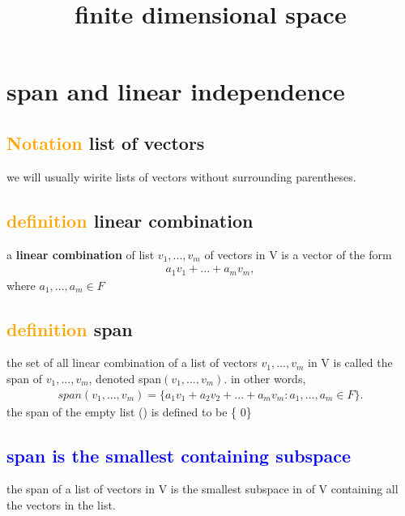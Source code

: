 \documentclass[a4paper,12pt]{article}
\begin{document}
\title {finite dimensional space}
\maketitle

\tableofcontents
\newpage

\section{\textbf{span and linear independence}}
    \subsection{\textcolor{orange}{Notation} \textbf{list of vectors}}
    we will usually wirite lists of vectors without surrounding parentheses.

    \subsection{\textcolor{orange}{definition} \textbf{linear combination}}
    a \textbf{linear combination} of list $v_1,...,v_m$ of vectors in V is a vector of the form
    \begin{align*}
        a_1v_1 + ... + a_mv_m,
    \end{align*}
    where $a_1,...,a_m \in F$

    \subsection{\textcolor{orange}{definition} \textbf{span}}
    the set of all linear combination of a list of vectors $v_1,...,v_m$ in V is  called the span of 
    $v_1,...,v_m$, denoted span$(v_1,...,v_m)$. in other words,
    \begin{align*}
        span(v_1,...,v_m) = \{a_1v_1 + a_2v_2 + ... + a_mv_m : a_1,...,a_m \in F\}.
    \end{align*}
    the span of the empty list () is defined to be \{ 0\}

    \subsection{\textcolor{blue}{span is the smallest containing subspace}}
    the span of a list of vectors in V is the smallest subspace in of V containing all
    the vectors in the list.
\end{document}
